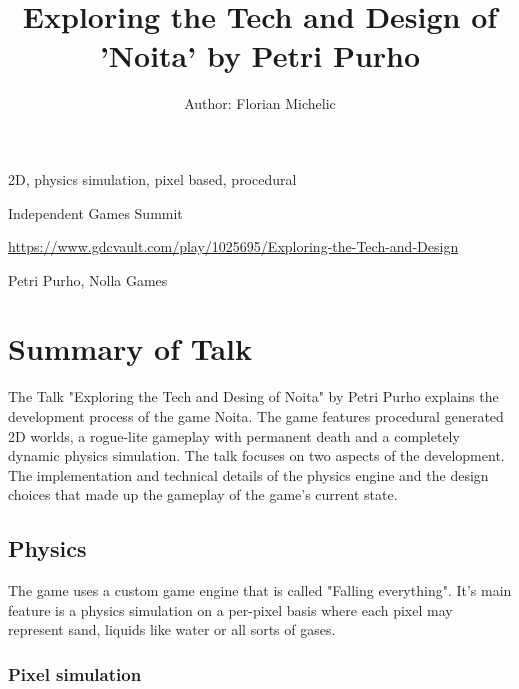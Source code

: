 \documentclass[a4paper]{article}
\title{	Exploring the Tech and Design of 'Noita' by Petri Purho}
\author{Author: Florian Michelic}
\begin{document}
\maketitle

\begin{keywords} 2D, physics simulation, pixel based, procedural \end{keywords}

\begin{track} 	Independent Games Summit \end{track}

\begin{talkurl}  \url{https://www.gdcvault.com/play/1025695/Exploring-the-Tech-and-Design} \end{talkurl}

\begin{speaker}Petri Purho, Nolla Games \end{speaker}


\begin{abstract}


\end{abstract}

\section{Summary of Talk}


The Talk "Exploring the Tech and Desing of Noita" by Petri Purho explains the development process of the game Noita. The game features procedural
generated 2D worlds, a rogue-lite gameplay with permanent death and a completely dynamic physics simulation. The talk focuses on two aspects of the development. The implementation and technical details of
the physics engine and the design choices that made up the gameplay of the game's current state. 


\subsection{Physics}

The game uses a custom game engine that is called "Falling everything". It's main feature is a physics simulation on a per-pixel basis where each pixel may represent sand, liquids like water or all sorts of gases.

\subsubsection{Pixel simulation}
\end{document}

